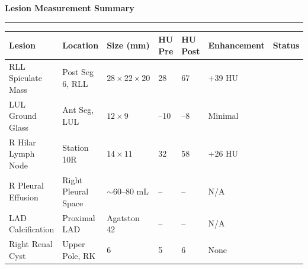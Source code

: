 \documentclass[11pt,a4paper]{article}
\newcommand{\subsectionrule}{%
  \vspace{1pt}%
  {\color{RadRule}\rule{\linewidth}{0.5pt}}%
  \vspace{3pt}%
}
\newcommand{\badgecritical}{%
  \begin{tikzpicture}[baseline=-2pt]
    \node[fill=RadRed, text=white, font=\bfseries\tiny, inner xsep=5pt, inner ysep=2pt, rounded corners=3pt] {CRITICAL};
  \end{tikzpicture}%
}
\newcommand{\badgemoderately}{%
  \begin{tikzpicture}[baseline=-2pt]
    \node[fill=RadAmber, text=white, font=\bfseries\tiny, inner xsep=5pt, inner ysep=2pt, rounded corners=3pt] {MODERATE};
  \end{tikzpicture}%
}
\newcommand{\badgenormal}{%
  \begin{tikzpicture}[baseline=-2pt]
    \node[fill=RadGreen, text=white, font=\bfseries\tiny, inner xsep=5pt, inner ysep=2pt, rounded corners=3pt] {NORMAL};
  \end{tikzpicture}%
}
\newcommand{\badgemild}{%
  \begin{tikzpicture}[baseline=-2pt]
    \node[fill=RadTeal, text=white, font=\bfseries\tiny, inner xsep=5pt, inner ysep=2pt, rounded corners=3pt] {MILD};
  \end{tikzpicture}%
}
\begin{document}

\begin{tcolorbox}[slatebox]
\noindent\textbf{\color{RadBlue}\faRuler\hspace{4pt}Lesion Measurement Summary}
\vspace{5pt}

\subsectionrule{}

\small
\setlength{\tabcolsep}{5pt}
\renewcommand{\arraystretch}{1.35}
\begin{tabular}{@{}lllllll@{}}
  \toprule
  \rowcolor{RadBlue}
  \color{white}\textbf{Lesion} &
  \color{white}\textbf{Location} &
  \color{white}\textbf{Size (mm)} &
  \color{white}\textbf{HU Pre} &
  \color{white}\textbf{HU Post} &
  \color{white}\textbf{Enhancement} &
  \color{white}\textbf{Status} \\
  \midrule{}
  RLL Spiculate Mass & Post Seg 6, RLL & $28\times22\times20$ & 28 & 67 & +39 HU & \badgecritical{} \\
  \rowcolor{RadBg}
  LUL Ground Glass & Ant Seg, LUL & $12\times9$ & --10 & --8 & Minimal & \badgemild{} \\
  R Hilar Lymph Node & Station 10R & $14\times11$ & 32 & 58 & +26 HU & \badgemoderately{} \\
  \rowcolor{RadBg}
  R Pleural Effusion & Right Pleural Space & $\sim$60--80 mL & -- & -- & N/A & \badgemoderately{} \\
  LAD Calcification & Proximal LAD & Agatston 42 & -- & -- & N/A & \badgemild{} \\
  \rowcolor{RadBg}
  Right Renal Cyst & Upper Pole, RK & 6 & 5 & 6 & None & \badgenormal{} \\
  \bottomrule
\end{tabular}
\end{tcolorbox}

\vspace{8pt}

\end{document}
